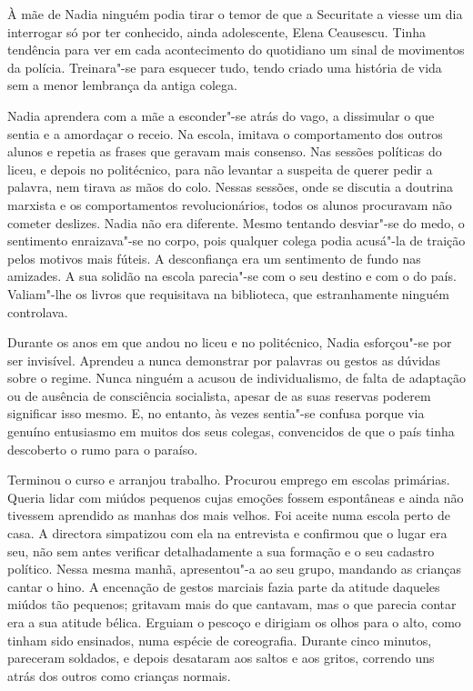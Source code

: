 À mãe de Nadia ninguém podia tirar o temor de que a Securitate a viesse
um dia interrogar só por ter conhecido, ainda adolescente, Elena
Ceausescu. Tinha tendência para ver em cada acontecimento do quotidiano
um sinal de movimentos da polícia. Treinara"-se para esquecer tudo, tendo
criado uma história de vida sem a menor lembrança da antiga colega.

Nadia aprendera com a mãe a esconder"-se atrás do vago, a dissimular o
que sentia e a amordaçar o receio. Na
escola, imitava o comportamento dos outros alunos e repetia as frases
que geravam mais consenso. Nas sessões políticas do liceu, e depois no
politécnico, para não levantar a suspeita de querer pedir a palavra,
nem tirava as mãos do colo. Nessas sessões, onde se discutia a doutrina
marxista e os comportamentos revolucionários, todos os alunos procuravam
não cometer deslizes. Nadia não era diferente. Mesmo tentando desviar"-se
do medo, o sentimento enraizava"-se no corpo, pois qualquer colega
podia acusá"-la de traição pelos motivos mais fúteis. A desconfiança
era um sentimento de fundo nas amizades. A sua solidão na escola
parecia"-se com o seu destino e com o do país. Valiam"-lhe os livros que
requisitava na biblioteca, que estranhamente ninguém controlava.

Durante os anos em que andou no liceu e no politécnico, Nadia esforçou"-se por ser invisível. Aprendeu a nunca demonstrar
por palavras ou gestos as dúvidas sobre o regime. Nunca ninguém a acusou
de individualismo, de falta de adaptação ou de ausência de consciência
socialista, apesar de as suas reservas poderem significar isso mesmo. E,
no entanto, às vezes sentia"-se confusa porque via genuíno entusiasmo em
muitos dos seus colegas, convencidos de que o país tinha descoberto o
rumo para o paraíso.

Terminou o curso e arranjou trabalho. Procurou emprego em escolas
primárias. Queria lidar com miúdos pequenos cujas emoções fossem
espontâneas e ainda não tivessem aprendido as manhas dos mais velhos.
Foi aceite numa escola perto de casa. A directora simpatizou com ela na
entrevista e confirmou que o lugar era seu, não sem antes verificar
detalhadamente a sua formação e o seu
cadastro político. Nessa mesma manhã, apresentou"-a ao seu grupo,
mandando as crianças cantar o hino. A encenação de gestos marciais
fazia parte da atitude daqueles miúdos tão pequenos; gritavam mais do
que cantavam, mas o que parecia contar era a sua atitude bélica. Erguiam
o pescoço e dirigiam os olhos para o alto, como tinham sido ensinados,
numa espécie de coreografia. Durante cinco minutos, pareceram soldados,
e depois desataram aos saltos e aos gritos, correndo uns atrás dos
outros como crianças normais.

